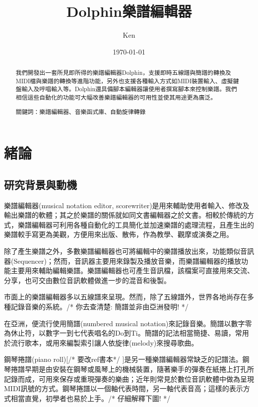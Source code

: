 \documentclass[12pt,a4paper,oneside]{report}
\begin{document}
\title{Dolphin樂譜編輯器}
\author{Ken}
\date{\today}
\maketitle

\begin{abstract}

我們開發出一套所見即所得的樂譜編輯器Dolphin，支援即時五線譜與簡譜的轉換及MIDI檔與樂譜的轉換等進階功能，另外也支援各種輸入方式如MIDI裝置輸入、虛擬鍵盤輸入及哼唱輸入等。Dolphin還具備腳本編輯器讓使用者撰寫腳本來控制樂譜。我們相信這些自動化的功能可大幅改善樂譜編輯器的可用性並使其用途更為廣泛。

關鍵詞：樂譜編輯器、音樂函式庫、自動旋律轉錄

\end{abstract}

\tableofcontents

\chapter{緒論}

\section{研究背景與動機}

樂譜編輯器(musical notation editor, scorewriter)是用來輔助使用者輸入、修改及輸出樂譜的軟體；其之於樂譜的關係就如同文書編輯器之於文書。相較於傳統的方式，樂譜編輯器可利用各種自動化的工具簡化並加速樂譜的處理流程，且產生出的樂譜較手寫更為美觀，方便用來出版、散佈，作為教學、觀摩或演奏之用。

除了產生樂譜之外，多數樂譜編輯器也可將編輯中的樂譜播放出來，功能類似音訊器(Sequencer)；然而，音訊器主要用來錄製及播放音樂，而樂譜編輯器的播放功能主要用來輔助編輯樂譜。樂譜編輯器也可產生音訊檔，該檔案可直接用來交流、分享，也可交由數位音訊軟體做進一步的混音和後製。

市面上的樂譜編輯器多以五線譜來呈現。然而，除了五線譜外，世界各地尚存在多種記錄音樂的系統。/* 你去查清楚: 簡譜並非由亞洲發明!  */

在亞洲，便流行使用簡譜(numbered musical notation)來記錄音樂。簡譜以數字零為休止符，以數字一到七代表唱名的Do到Ti。簡譜的記法相當簡捷、易讀，常用於流行歌本，或用來編製索引讓人依旋律(melody)來搜尋歌曲。

鋼琴捲譜(piano roll)[/* 要改ref書本*/ ]是另一種樂譜編輯器常缺乏的記譜法。鋼琴捲譜早期是由安裝在鋼琴或風琴上的機械裝置，隨著樂手的彈奏在紙捲上打孔所記錄而成，可用來保存或重現彈奏的樂曲；近年則常見於數位音訊軟體中做為呈現MIDI訊號的方式。鋼琴捲譜以一個軸代表時間，另一軸代表音高；這樣的表示方式相當直覺，初學者也易於上手。/*  仔細解釋下圖!  */
\end{document}
